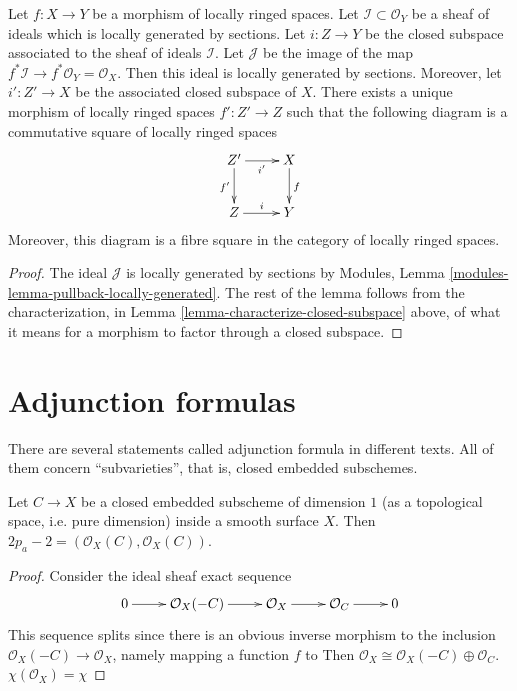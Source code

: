 \begin{lemma}
\label{lemma-restrict-map-to-closed}
Let $f : X \to Y$ be a morphism of locally ringed spaces.
Let $\mathcal{I} \subset \mathcal{O}_Y$ be a sheaf of
ideals which is locally generated by sections.
Let $i : Z \to Y$ be the closed subspace associated to the
sheaf of ideals $\mathcal{I}$.
Let $\mathcal{J}$ be the image of the map
$f^*\mathcal{I} \to f^*\mathcal{O}_Y = \mathcal{O}_X$.
Then this ideal is locally generated by sections.
Moreover, let $i' : Z' \to X$ be the associated closed
subspace of $X$. There exists a unique
morphism of locally ringed spaces $f' : Z' \to Z$ such
that the following diagram is a commutative square of
locally ringed spaces
$$
\xymatrix{
Z' \ar[d]_{f'} \ar[r]_{i'} & X \ar[d]^f \\
Z \ar[r]^{i} & Y
}
$$
Moreover, this diagram is a fibre square in the category of
locally ringed spaces.
\end{lemma}

\begin{proof}
The ideal $\mathcal{J}$ is locally generated by sections
by Modules, Lemma \ref{modules-lemma-pullback-locally-generated}.
The rest of the lemma follows from the characterization,
in Lemma \ref{lemma-characterize-closed-subspace} above,
of what it means for a morphism to factor through a closed
subspace.
\end{proof}

\section{Adjunction formulas}
\label{section-adjunction formulas}

There are several statements called adjunction formula
in different texts. All of them concern ``subvarieties'',
that is, closed embedded subschemes.

\begin{exercise}
\label{exercise-genus-formula-for-curve-on-surface}
Let $C \to X$ be a closed embedded subscheme 
of dimension $1$ (as a topological space, i.e. pure dimension)
inside a smooth surface $X$.
Then $2p_a-2=(\mathcal{O}_X(C),\mathcal{O}_X(C))$.
\end{exercise}

\begin{proof}
Consider the ideal sheaf exact sequence
$$
\xymatrix{
0\ar[r]&\mathcal{O}_X(-C)\ar[r]&\mathcal{O}_X\ar[r]&\mathcal{O}_C\ar[r]&0
}
$$
This sequence splits since there is an obvious inverse morphism
to the inclusion $\mathcal{O}_X(-C)\to \mathcal{O}_X$, namely
mapping a function $f$ to 
Then $\mathcal{O}_X\cong \mathcal{O}_X(-C) \oplus \mathcal{O}_C$.
 $\chi(\mathcal{O}_X)=\chi$
\end{proof}

